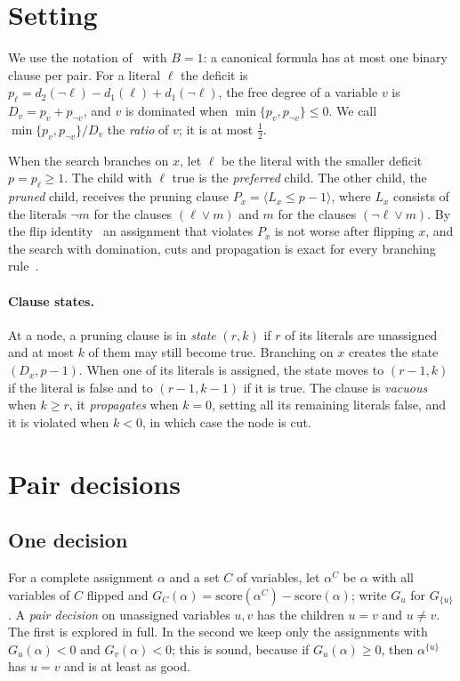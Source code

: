 \documentclass[11pt,a4paper]{article}
\theoremstyle{remark}
\begin{document}
\section{Setting}\label{sec:setting}

We use the notation of~\cite[Section~2]{N3} with $B=1$: a canonical formula
has at most one binary clause per pair. For a literal $\ell$ the deficit is
$p_\ell=d_2(\neg\ell)-d_1(\ell)+d_1(\neg\ell)$, the free degree of a variable
$v$ is $D_v=p_v+p_{\neg v}$, and $v$ is dominated when $\min\{p_v,p_{\neg v}\}\le
0$. We call $\min\{p_v,p_{\neg v}\}/D_v$ the \emph{ratio} of $v$; it is at most
$\frac12$.

When the search branches on $x$, let $\ell$ be the literal with the smaller
deficit $p=p_\ell\ge1$. The child with $\ell$ true is the \emph{preferred}
child. The other child, the \emph{pruned} child, receives the pruning clause
$P_x=\langle L_x\le p-1\rangle$, where $L_x$ consists of the literals $\neg m$
for the clauses $(\ell\lor m)$ and $m$ for the clauses $(\neg\ell\lor m)$.
By the flip identity~\cite[Lemma~18]{N3} an assignment that violates $P_x$ is
not worse after flipping $x$, and the search with domination, cuts and
propagation is exact for every branching rule~\cite[Proposition~20]{N3}.

\paragraph{Clause states.} At a node, a pruning clause is in \emph{state}
$(r,k)$ if $r$ of its literals are unassigned and at most $k$ of them may
still become true. Branching on $x$ creates the state $(D_x,p-1)$. When one of
its literals is assigned, the state moves to $(r-1,k)$ if the literal is false
and to $(r-1,k-1)$ if it is true. The clause is \emph{vacuous} when $k\ge r$,
it \emph{propagates} when $k=0$, setting all its remaining literals false, and
it is violated when $k<0$, in which case the node is cut.

\section{Pair decisions}\label{sec:pairs}

\subsection{One decision}

For a complete assignment $\alpha$ and a set $C$ of variables, let $\alpha^C$
be $\alpha$ with all variables of $C$ flipped and
$G_C(\alpha)=\mathrm{score}(\alpha^C)-\mathrm{score}(\alpha)$; write $G_u$ for
$G_{\{u\}}$. A \emph{pair decision} on unassigned variables $u,v$ has the
children $u=v$ and $u\ne v$. The first is explored in full. In the second we
keep only the assignments with $G_u(\alpha)<0$ and $G_v(\alpha)<0$; this is
sound, because if $G_u(\alpha)\ge0$, then $\alpha^{\{u\}}$ has $u=v$ and is at
least as good.
\end{document}
